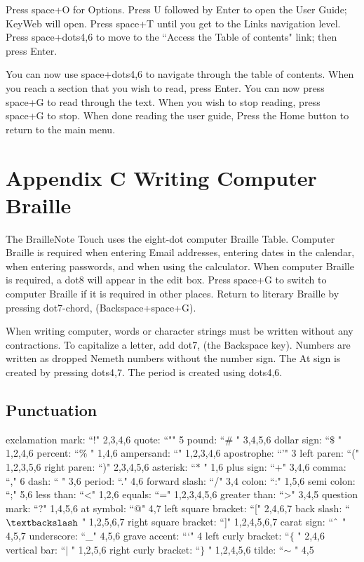 \documentclass[10pt,letterpaper,twoside]{report}
\begin{document}
{{{Press space+O for Options.
Press U followed by Enter to open the User Guide; KeyWeb will open.
Press space+T until you get to the Links navigation level.
Press space+dots4,6 to move to the ``Access the Table of contents" link; then press Enter.

You can now use space+dots4,6 to navigate through the table of contents. When you reach a section that you wish to read, press Enter. You can now press space+G to read through the text. When you wish to stop reading, press space+G to stop.
When done reading the user guide, Press the Home button to return to the main menu.

\section{Appendix C Writing Computer Braille}

The BrailleNote Touch uses the eight-dot computer Braille Table. Computer Braille is required when entering Email addresses, entering dates in the calendar, when entering passwords, and when using the calculator. When computer Braille is required, a dot8 will appear in the edit box. Press space+G to switch to computer Braille if it is required in other places. Return to literary Braille by pressing dot7-chord, (Backspace+space+G).

When writing computer, words or character strings must be written without any contractions. To capitalize a letter, add dot7, (the Backspace key).
Numbers are written as dropped Nemeth numbers without the number sign.
The At sign is created by pressing dots4,7.
The period is created using dots4,6.

\subsection{Punctuation}

exclamation mark: ``!" 2,3,4,6
quote: ``"" 5
pound: ``$\#$ " 3,4,5,6
dollar sign: ``$\$$ " 1,2,4,6
percent: ``$\%$ " 1,4,6
ampersand: ``" 1,2,3,4,6
apostrophe: ``'" 3
left paren: ``(" 1,2,3,5,6
right paren: ``)" 2,3,4,5,6
asterisk: ``$\ast$ " 1,6
plus sign: ``+" 3,4,6
comma: ``," 6
dash: `` " 3,6
period: ``." 4,6
forward slash: ``/" 3,4
colon: ``:" 1,5,6
semi colon: ``;" 5,6
less than: ``<" 1,2,6
equals: ``=" 1,2,3,4,5,6
greater than: ``>" 3,4,5
question mark: ``?" 1,4,5,6
at symbol: ``@" 4,7
left square bracket: ``[" 2,4,6,7
back slash: ``$\textbackslash$ " 1,2,5,6,7
right square bracket: ``]" 1,2,4,5,6,7
carat sign: ``$ \string^ $ " 4,5,7
underscore: ``\_" 4,5,6
grave accent: ```" 4
left curly bracket: ``$ \{ $ " 2,4,6
vertical bar: ``$ \vert $ " 1,2,5,6
right curly bracket: ``$ \} $ " 1,2,4,5,6
tilde: ``$ \sim $ " 4,5

}}}
\end{document}
